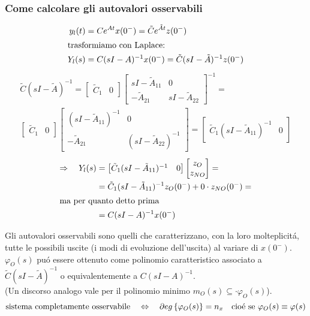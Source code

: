 \documentclass[../main.tex]{subfiles}
\begin{document}
	\subsubsection{Come calcolare gli autovalori osservabili}
		\begin{align*}
			y_l(t) &= C e^{At} x(0^{-}) = \tilde C e^{\tilde At} z(0^{-})\\
			\intertext{trasformiamo con Laplace:}
			Y_l(s) &= C(sI-A)^{-1}x(0^{-}) = \tilde C (sI-\tilde A)^{-1} z(0^{-})
		\end{align*}
		\begin{align*}
			\tilde C (sI-\tilde A)^{-1} =
			\begin{bmatrix}
				\tilde C_1 & 0
			\end{bmatrix}
			\begin{bmatrix}
				sI-\tilde A_{11} & 0\\
				-\tilde A_{21} & sI-\tilde A_{22}
			\end{bmatrix}^{-1} =
			\\
			\begin{bmatrix}
				\tilde C_1 & 0
			\end{bmatrix}
			\begin{bmatrix}
				(sI-\tilde A_{11})^{-1} & 0\\
				-\tilde A_{21} & (sI-\tilde A_{22})^{-1}
			\end{bmatrix} =
			\begin{bmatrix}
				\tilde C_1 (sI- \tilde A_{11})^{-1} & 0
			\end{bmatrix}
		\end{align*}
		\begin{align*}
			\Rightarrow\quad Y_l(s) &=
			\begin{bmatrix}
				\tilde C_1(sI-\tilde A_{11})^{-1} & 0
			\end{bmatrix}
			\begin{bmatrix}
				z_O\\
				z_{NO}
			\end{bmatrix} =
			\\
			&= \tilde C_1 (sI-\tilde A_{11})^{-1} z_O(0^{-}) + 0 \cdot z_{NO}(0^{-}) =
			\\
			\intertext{ma per quanto detto prima}
			&= C(sI-A)^{-1} x(0^{-})
		\end{align*}
		
		Gli autovalori osservabili sono quelli che caratterizzano, con la loro molteplicit\'a, tutte le possibili uscite (i modi di evoluzione dell'uscita) al variare di $ x(0^{-}) $. $ \varphi_O(s) $ pu\'o essere ottenuto come polinomio caratteristico associato a $ \tilde C (sI-\tilde A)^{-1} $ o equivalentemente a $ C(sI-A)^{-1} $.\\
		(Un discorso analogo vale per il polinomio minimo $ m_O(s) \subseteq \cdot \varphi_O(s) $).
		\[
			\text{sistema completamente osservabile} \quad\Leftrightarrow\quad \partial eg \left\lbrace \varphi_O(s) \right\rbrace = n_x \quad\text{cio\'e se}\ \varphi_O(s) \equiv \varphi(s)
		\]
		
\end{document}
